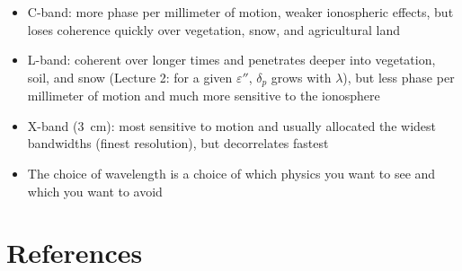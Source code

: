 \documentclass[11pt, oneside]{article}
\begin{document}
\begin{itemize}
	\item C-band: more phase per millimeter of motion, weaker ionospheric effects, but loses coherence quickly over vegetation, snow, and agricultural land
	\item L-band: coherent over longer times and penetrates deeper into vegetation, soil, and snow (Lecture 2: for a given $\varepsilon''$, $\delta_p$ grows with $\lambda$), but less phase per millimeter of motion and much more sensitive to the ionosphere
	\item X-band (3~cm): most sensitive to motion and usually allocated the widest bandwidths (finest resolution), but decorrelates fastest
	\item[$\Rightarrow$] The choice of wavelength is a choice of which physics you want to see and which you want to avoid
\end{itemize}

\section*{References}
\end{document}
